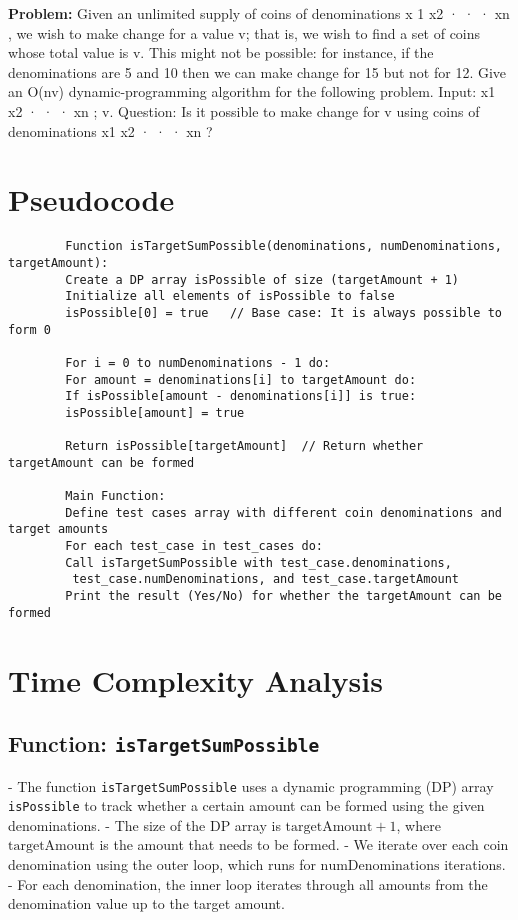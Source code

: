 \documentclass[a4paper,12pt]{report}
\begin{document}
\textbf{Problem:}
Given an unlimited supply of coins of denominations x 1 x2 · · · xn , we wish to make change for a value v; that is, we wish to find a set of coins whose total value is v. This might not be possible: for instance, if the denominations are 5 and 10 then we can make change for 15 but not for 12. Give an O(nv) dynamic-programming algorithm for the following problem.
Input: x1 x2 · · · xn ; v.
Question: Is it possible to make change for v using coins of denominations x1 x2 · · · xn ?


\section*{Pseudocode}

\begin{tcolorbox}[colback=white, colframe=black, boxrule=0.5pt]
	\ttfamily\small
	\begin{verbatim}
		Function isTargetSumPossible(denominations, numDenominations, targetAmount):
		Create a DP array isPossible of size (targetAmount + 1)
		Initialize all elements of isPossible to false
		isPossible[0] = true   // Base case: It is always possible to form 0
		
		For i = 0 to numDenominations - 1 do:
		For amount = denominations[i] to targetAmount do:
		If isPossible[amount - denominations[i]] is true:
		isPossible[amount] = true
		
		Return isPossible[targetAmount]  // Return whether targetAmount can be formed
		
		Main Function:
		Define test cases array with different coin denominations and target amounts
		For each test_case in test_cases do:
		Call isTargetSumPossible with test_case.denominations,
		 test_case.numDenominations, and test_case.targetAmount
		Print the result (Yes/No) for whether the targetAmount can be formed
	\end{verbatim}
\end{tcolorbox}

\section*{Time Complexity Analysis}

\subsection*{Function: \texttt{isTargetSumPossible}}

- The function \texttt{isTargetSumPossible} uses a dynamic programming (DP) array \texttt{isPossible} to track whether a certain amount can be formed using the given denominations.
- The size of the DP array is \( \text{targetAmount} + 1 \), where \(\text{targetAmount}\) is the amount that needs to be formed.
- We iterate over each coin denomination using the outer loop, which runs for \( \text{numDenominations} \) iterations.
- For each denomination, the inner loop iterates through all amounts from the denomination value up to the target amount.
\end{document}
